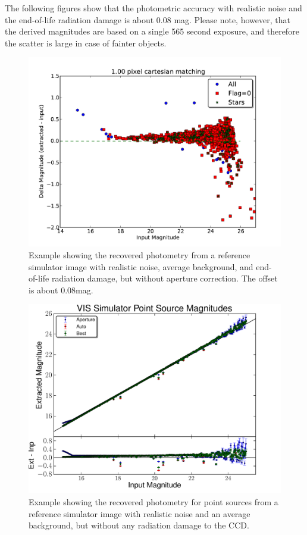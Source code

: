 \documentclass[a4paper,12pt,english]{sphinxmanual}
\begin{document}
The following figures show that the photometric accuracy with realistic noise and the end-of-life radiation damage is
about 0.08 mag. Please note, however, that the derived magnitudes are based on a
single 565 second exposure, and therefore the scatter is large in case of fainter objects.
\begin{figure}[htbp]
\centering
\capstart

\includegraphics{Magnitudes15.pdf}
\caption{Example showing the recovered photometry from a reference simulator image with realistic noise, average background,
and end-of-life radiation damage, but without aperture correction. The offset is about 0.08mag.}\end{figure}
\begin{figure}[htbp]
\centering
\capstart

\includegraphics{magnitudes.pdf}
\caption{Example showing the recovered photometry for point sources from a reference simulator image with realistic noise
and an average background, but without any radiation damage to the CCD.}\end{figure}
\end{document}
